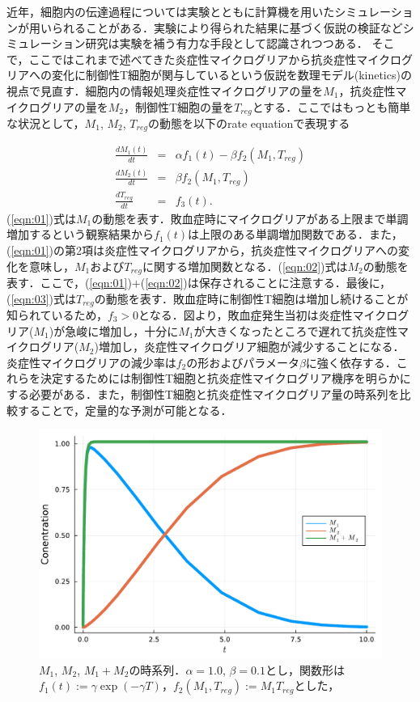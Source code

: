 \documentclass{jsarticle}
\begin{document}
近年，細胞内の伝達過程については実験とともに計算機を用いたシミュレーションが用いられることがある．実験により得られた結果に基づく仮説の検証などシミュレーション研究は実験を補う有力な手段として認識されつつある．
そこで，ここではこれまで述べてきた炎症性マイクログリアから抗炎症性マイクログリアへの変化に制御性T細胞が関与しているという仮説を数理モデル(kinetics)の視点で見直す．細胞内の情報処理炎症性マイクログリアの量を$M_1$，抗炎症性マイクログリアの量を$M_2$，制御性T細胞の量を$T_{reg}$とする．ここではもっとも簡単な状況として，$M_1$, $M_2$, $T_{reg}$の動態を以下のrate equationで表現する

\begin{eqnarray}
  \label{eqn:01}
  \frac{dM_{1}(t)}{dt} &=& \alpha f_1(t)- \beta f_2(M_1, T_{reg}) \\
  \label{eqn:02}
  \frac{dM_2(t)}{dt} &=& \beta f_2(M_1, T_{reg}) \\
  \label{eqn:03}
  \frac{dT_{reg}}{dt} &=& f_3(t).
\end{eqnarray}
(\ref{eqn:01})式は$M_1$の動態を表す．敗血症時にマイクログリアがある上限まで単調増加するという観察結果から$f_1(t)$は上限のある単調増加関数である．また，(\ref{eqn:01})の第2項は炎症性マイクログリアから，抗炎症性マイクログリアへの変化を意味し，$M_1$および$T_{reg}$に関する増加関数となる．(\ref{eqn:02})式は$M_2$の動態を表す．ここで，(\ref{eqn:01})$+$(\ref{eqn:02})は保存されることに注意する．最後に，(\ref{eqn:03})式は$T_{reg}$の動態を表す．敗血症時に制御性T細胞は増加し続けることが知られているため，$f_3>0$となる．図より，敗血症発生当初は炎症性マイクログリア($M_1$)が急峻に増加し，十分に$M_1$が大きくなったところで遅れて抗炎症性マイクログリア($M_2$)増加し，炎症性マイクログリア細胞が減少することになる．炎症性マイクログリアの減少率は$f_2$の形およびパラメータ$\beta$に強く依存する．これらを決定するためには制御性T細胞と抗炎症性マイクログリア機序を明らかにする必要がある．また，制御性T細胞と抗炎症性マイクログリア量の時系列を比較することで，定量的な予測が可能となる．

\begin{figure}[h]
  \centering
    \includegraphics[width=12cm,clip]{../fig/masafig01.pdf}
        \caption{$M_1$, $M_2$, $M_1+M_2$の時系列．$\alpha=1.0$, $\beta=0.1$とし，関数形は$f_1(t):= \gamma\exp{(-\gamma T)}$，$f_2(M_1, T_{reg}):=M_1T_{reg}$とした，}
      \label{fig:01}
  \end{figure}
\end{document}
